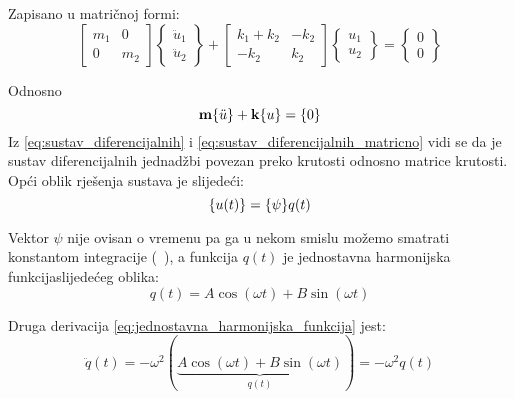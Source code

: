 Zapisano u matričnoj formi:
\begin{equation}\label{eq:sustav_diferencijalnih_matricno}
    \begin{bmatrix}
        m_1 & 0 \\
        0   & m_2
    \end{bmatrix}
    \begin{Bmatrix}
        \ddot{u}_1\\
        \ddot{u}_2
    \end{Bmatrix}
    +
    \begin{bmatrix}
        k_1+k_2 & -k_2\\
        -k_2 & k_2
    \end{bmatrix}
    \begin{Bmatrix}
        u_1\\
        u_2
    \end{Bmatrix}
    =
    \begin{Bmatrix}
        0\\
        0
    \end{Bmatrix}
\end{equation}

Odnosno
\begin{equation}\label{eq:sustav_diferencijalnih_matricni_kratko}
    \mm\vtor{u}{:}+\kk\vtor{u}{}=\vtor{0}{}
\end{equation}
Iz \eqref{eq:sustav_diferencijalnih} i \eqref{eq:sustav_diferencijalnih_matricno}
vidi se da je sustav diferencijalnih jednadžbi povezan preko krutosti odnosno
matrice krutosti. Opći oblik rješenja sustava je slijedeći:
\begin{equation}\label{eq:rjesenje_opcenitog_sustava}
    \vtor{u(t)}{} = \vtor{\psi}{}q(t)
\end{equation}

Vektor $\psi$ nije ovisan o vremenu pa ga u nekom smislu možemo smatrati konstantom
integracije (~\cite{diferencijalne}), a funkcija $q(t)$ je jednostavna harmonijska 
funkcija\footnotemark slijedećeg oblika: \begin{equation}\label{eq:jednostavna_harmonijska_funkcija}
    q(t)=A\cos(\omega t) + B\sin(\omega t)
\end{equation}


Druga derivacija \eqref{eq:jednostavna_harmonijska_funkcija} jest:
\begin{equation}\label{eq:jednostavna_harmonijska_funkcija_dd}
    \ddot{q}(t)=-\omega^2(
    \underbrace{
        A\cos(\omega t) + B\sin(\omega t)
    }_{\text{$q(t)$}}
    )
    =-\omega^2q(t)
\end{equation}

